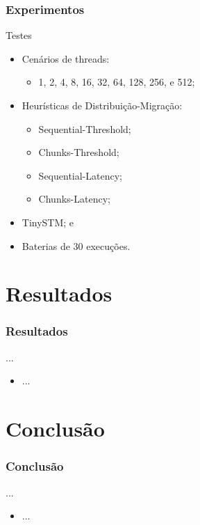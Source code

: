 \documentclass[10pt, pdf,xcolor=pdftex,dvipsnames,table]{beamer}
\begin{document}
\begin{frame} \frametitle{Experimentos}
    \begin{block}{Testes}
        \begin{itemize}
        	\item Cenários de threads: 
            \begin{itemize}
                \item 1, 2, 4, 8, 16, 32, 64, 128, 256, e 512;
            \end{itemize}
            \item Heurísticas de Distribuição-Migração:
            \begin{itemize}
                \item Sequential-Threshold;
                \item Chunks-Threshold;
                \item Sequential-Latency;
                \item Chunks-Latency;
            \end{itemize}
            \item TinySTM; e
            \item Baterias de 30 execuções.
        \end{itemize}
    \end{block}
\end{frame}

\section{Resultados}
\begin{frame} \frametitle{Resultados}
    \begin{block}{...}
        \begin{itemize}
        	\item ...
        \end{itemize}
    \end{block}
\end{frame}

\section{Conclusão}
\begin{frame} \frametitle{Conclusão}
    \begin{block}{...}
        \begin{itemize}
        	\item ...
        \end{itemize}
    \end{block}
\end{frame}
\end{document}
